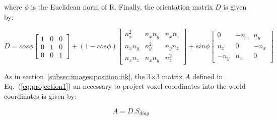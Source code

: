 where $\phi$ is the Euclidean norm of R. Finally, the orientation matrix $D$ is given by:

\begin{equation}
D =
cos \phi
\begin{bmatrix}
1 & 0 & 0 \\
0 & 1 & 0 \\
0 & 0 & 1
\end{bmatrix}
+ (1 - cos \phi)
\begin{bmatrix}
n_x^2 & n_x n_y & n_x n_z \\
n_x n_y & n_y^2 & n_y n_z \\
n_x n_z & n_x n_y & n_z^2
\end{bmatrix}
+ sin \phi
\begin{bmatrix}
0 & -n_z & n_y \\
n_z & 0 & -n_x \\
-n_y & n_x & 0
\end{bmatrix}
\end{equation}

As in section~\ref{subsec:images:position:itk}, the 3$\times$3 matrix $A$ defined in Eq.~(\ref{eq:projection1}) an necessary to project voxel coordinates into the world coordinates is given by:

\begin{equation}
A=D.S_{diag}
\end{equation}
